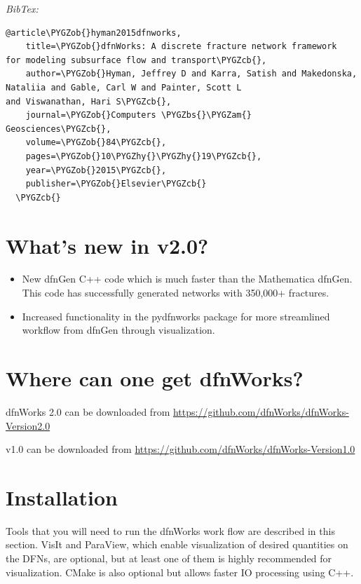 \documentclass[letterpaper,10pt,english]{sphinxmanual}
\def\PYGZbs{\char`\\}
\def\PYGZob{\char`\{}
\def\PYGZcb{\char`\}}
\def\PYGZam{\char`\&}
\def\PYGZhy{\char`\-}
\begin{document}
\emph{BibTex:}

\begin{Verbatim}[commandchars=\\\{\}]
  @article\PYGZob{}hyman2015dfnworks,
    title=\PYGZob{}dfnWorks: A discrete fracture network framework
for modeling subsurface flow and transport\PYGZcb{},
    author=\PYGZob{}Hyman, Jeffrey D and Karra, Satish and Makedonska,
Nataliia and Gable, Carl W and Painter, Scott L
and Viswanathan, Hari S\PYGZcb{},
    journal=\PYGZob{}Computers \PYGZbs{}\PYGZam{} Geosciences\PYGZcb{},
    volume=\PYGZob{}84\PYGZcb{},
    pages=\PYGZob{}10\PYGZhy{}\PYGZhy{}19\PYGZcb{},
    year=\PYGZob{}2015\PYGZcb{},
    publisher=\PYGZob{}Elsevier\PYGZcb{}
  \PYGZcb{}
\end{Verbatim}


\section{What's new in v2.0?}
\label{intro:what-s-new-in-v2-0}\begin{itemize}
\item {} 
New dfnGen C++ code which is much faster than the Mathematica dfnGen. This code has successfully generated networks with 350,000+ fractures.

\item {} 
Increased functionality in the pydfnworks package for more streamlined workflow from dfnGen through visualization.

\end{itemize}


\section{Where can one get dfnWorks?}
\label{intro:where-can-one-get-dfnworks}
dfnWorks 2.0 can be downloaded from \href{https://github.com/dfnWorks/dfnWorks-Version2.0}{https://github.com/dfnWorks/dfnWorks-Version2.0}

v1.0 can be downloaded from \href{https://github.com/dfnWorks/dfnWorks-Version1.0}{https://github.com/dfnWorks/dfnWorks-Version1.0}


\section{Installation}
\label{intro:installation}
Tools that you will need to run the dfnWorks work flow are described in this section. VisIt and ParaView, which enable visualization of desired quantities on the DFNs, are optional, but at least one of them is highly recommended for visualization. CMake is also optional but allows faster IO processing using C++.
\end{document}

